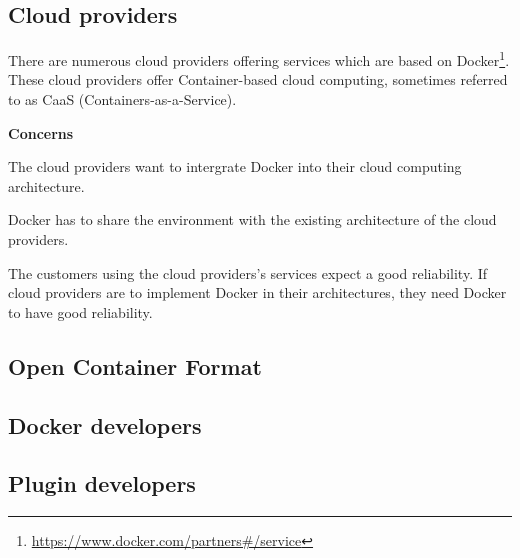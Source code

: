 \subsection*{Cloud providers}
There are numerous cloud providers offering services which are based on Docker\footnote{\url{https://www.docker.com/partners\#/service}}. These cloud providers offer Container-based cloud computing, sometimes referred to as CaaS (Containers-as-a-Service).


\textbf{Concerns}
\begin{description}[labelindent=25pt,style=multiline,leftmargin=4.5cm,font=\normalfont\itshape]

\item[Implementability] The cloud providers want to intergrate Docker into their cloud computing architecture.

\item[Co-Existence] Docker has to share the environment with the existing architecture of the cloud providers.

\item[Reliability] The customers using the cloud providers's services expect a good reliability. If cloud providers are to implement Docker in their architectures, they need Docker to have good reliability.

\end{description}



\subsection*{Open Container Format}

\subsection*{Docker developers}

\subsection*{Plugin developers}

